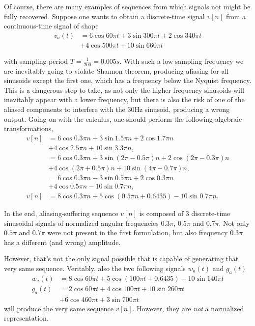 \documentclass[\documentfontsize, twocolumn]{\classname}
\begin{document}
Of course, there are many examples of se\-quen\-ces from which signals not might be fully recovered. Suppose one wants to obtain a discrete-time signal $v[n]$ from a con\-ti\-nuo\-us-time signal of shape
\begin{align*}
v_a(t) &=6\cos{60\pi t} + 3\sin{300\pi t} + 2\cos{340\pi t} \\ & + 4\cos{500\pi t} + 10\sin{660\pi t}
\end{align*}

with sampling period $T = \frac 1 {200} = 0.005s$. With such a low sampling frequency we are inevitably going to violate Shannon theorem, producing aliasing for all sinusoids except the first one, which has a frequency below the Nyquist frequency. This is a dangerous step to take, as not only the higher frequency sinusoids will inevitably appear with a lower frequency, but there is also the risk of one of the aliased components to interfere with the $30$Hz sinusoid, producing a wrong output.
Going on with the calculus, one should perform the following algebraic transformations,
\begin{align*}
    v[n] &= 6 \cos{0.3 \pi n} + 3 \sin{1.5 \pi n} + 2 \cos{1.7 \pi n} \\
         &+ 4 \cos{2.5 \pi n} + 10 \sin{3.3 \pi n},\\
         &= 6 \cos{0.3 \pi n} + 3 \sin{(2\pi -0.5 \pi) n} + 2 \cos{(2\pi - 0.3\pi)n} \\
         &+ 4 \cos{(2 \pi + 0.5\pi) n} + 10 \sin{(4 \pi - 0.7\pi) n},\\
         &= 6 \cos{0.3 \pi n} - 3 \sin{0.5 \pi n} + 2 \cos{0.3\pi n} \\
         &+ 4 \cos{0.5\pi n} - 10 \sin{0.7\pi n},\\
    v[n] &= 8 \cos{0.3 \pi n} + 5 \cos{(0.5 \pi n + 0.6435)} - 10 \sin{0.7\pi n}.
\end{align*}

In the end, aliasing-suffering sequence $v[n]$ is composed of 3 discrete-time sinusoidal signals of normalized angular frequencies $0.3\pi$, $0.5\pi$ and $0.7\pi$. Not only $0.5\pi$ and $0.7\pi$ were not present in the first formulation, but also frequency $0.3\pi$ has a different (and wrong) amplitude.

However, that's not the only signal possible that is capable of generating that very same sequence. Veritably, also the two following signals $w_a(t)$ and $g_a(t)$
\begin{align*}
    w_a(t) &= 8 \cos{60 \pi t} + 5\cos{(100 \pi t + 0.6435)} - 10\sin {140\pi t}\\
    g_a(t) &= 2 \cos{60 \pi t} + 4\cos{100 \pi t} + 10\sin {260\pi t}\\
           &+ 6\cos{460\pi t} + 3 \sin{700\pi t}
\end{align*}
will produce the very same sequence $v[n]$.
However, they are \emph{not} a normalized representation.
\end{document}
